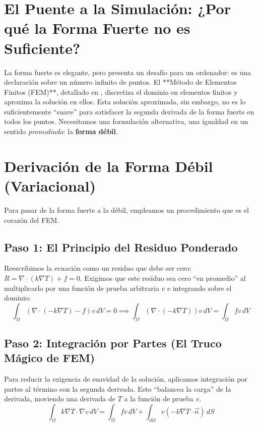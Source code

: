 \section{El Puente a la Simulación: ¿Por qué la Forma Fuerte no es Suficiente?}
La forma fuerte es elegante, pero presenta un desafío para un ordenador: es una declaración sobre un número infinito de puntos. El **Método de Elementos Finitos (FEM)**, detallado en \cite{zienkiewicz2013}, discretiza el dominio en elementos finitos y aproxima la solución en ellos. Esta solución aproximada, sin embargo, no es lo suficientemente ``suave'' para satisfacer la segunda derivada de la forma fuerte en todos los puntos. Necesitamos una formulación alternativa, una igualdad en un sentido \textit{promediado}: la \textbf{forma débil}.

\section{Derivación de la Forma Débil (Variacional)}
Para pasar de la forma fuerte a la débil, empleamos un procedimiento que es el corazón del FEM.
\subsection{Paso 1: El Principio del Residuo Ponderado}
Reescribimos la ecuación como un residuo que debe ser cero: $R = \nabla \cdot (k \nabla T) + f = 0$. Exigimos que este residuo sea cero ``en promedio'' al multiplicarlo por una función de prueba arbitraria $v$ e integrando sobre el dominio:
\begin{equation}
    \int_{\Omega} \left( \nabla \cdot (-k \nabla T) - f \right) v \, dV = 0
    \implies \int_{\Omega} \left( \nabla \cdot (-k \nabla T) \right) v \, dV = \int_{\Omega} f v \, dV
\end{equation}

\subsection{Paso 2: Integración por Partes (El Truco Mágico de FEM)}
Para reducir la exigencia de suavidad de la solución, aplicamos integración por partes al término con la segunda derivada. Esto ``balancea la carga'' de la derivada, moviendo una derivada de $T$ a la función de prueba $v$.
\begin{equation}
    \int_{\Omega} k \nabla T \cdot \nabla v \, dV = \int_{\Omega} f v \, dV + \int_{\partial \Omega} v (-k \nabla T \cdot \vec{n}) \, dS
\end{equation}

